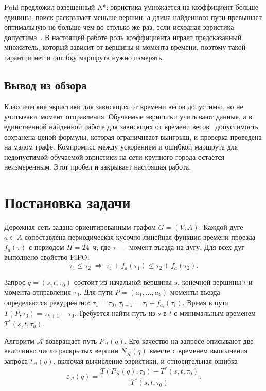 \documentclass{misisarticle}
\begin{document}
Pohl предложил взвешенный A*: эвристика умножается на коэффициент больше единицы, поиск раскрывает меньше вершин, а длина найденного пути превышает оптимальную не больше чем во столько же раз, если исходная эвристика допустима~\cite{pohl1970}. В настоящей работе роль коэффициента играет предсказанный множитель, который зависит от вершины и момента времени, поэтому такой гарантии нет и ошибку маршрута нужно измерять.

\subsection{Вывод из обзора}

Классические эвристики для зависящих от времени весов допустимы, но не учитывают момент отправления. Обучаемые эвристики учитывают данные, а в единственной найденной работе для зависящих от времени весов~\cite{liashenko2026} допустимость сохранена ценой формулы, которая ограничивает выигрыш, и проверка проведена на малом графе. Компромисс между ускорением и ошибкой маршрута для недопустимой обучаемой эвристики на сети крупного города остаётся неизмеренным. Этот пробел и закрывает настоящая работа.

\section{Постановка задачи}

Дорожная сеть задана ориентированным графом $G = (V, A)$. Каждой дуге $a \in A$ сопоставлена периодическая кусочно-линейная функция времени проезда $f_a(\tau)$ с периодом $\Pi = 24$~ч, где $\tau$~--- момент въезда на дугу. Для всех дуг выполнено свойство FIFO:
\begin{equation}
  \tau_1 \le \tau_2 \;\Rightarrow\; \tau_1 + f_a(\tau_1) \le \tau_2 + f_a(\tau_2).
  \label{eq:fifo}
\end{equation}

Запрос $q = (s, t, \tau_0)$ состоит из начальной вершины $s$, конечной вершины $t$ и момента отправления $\tau_0$. Для пути $P = (a_1, \ldots, a_k)$ моменты въезда определяются рекуррентно: $\tau_1 = \tau_0$, $\tau_{i+1} = \tau_i + f_{a_i}(\tau_i)$. Время в пути $T(P, \tau_0) = \tau_{k+1} - \tau_0$. Требуется найти путь из $s$ в $t$ с минимальным временем $T^*(s, t, \tau_0)$.

Алгоритм $\mathcal{A}$ возвращает путь $P_{\mathcal{A}}(q)$. Его качество на запросе описывают две величины: число раскрытых вершин $N_{\mathcal{A}}(q)$ вместе с временем выполнения запроса $t_{\mathcal{A}}(q)$, включая вычисление эвристики, и относительная ошибка
\begin{equation}
  \varepsilon_{\mathcal{A}}(q) = \frac{T(P_{\mathcal{A}}(q), \tau_0) - T^*(s, t, \tau_0)}{T^*(s, t, \tau_0)}.
  \label{eq:error}
\end{equation}
\end{document}
